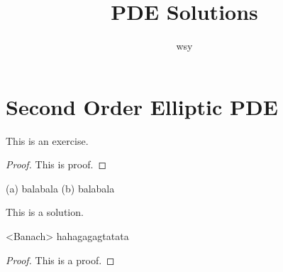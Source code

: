 \documentclass{mathexercise}
\title{PDE Solutions}
\author{wsy}
\begin{document}
\maketitle
  
\chapter{Second Order Elliptic PDE}

\begin{exercise}
  This is an exercise.
\end{exercise}

\begin{proof}
  This is proof.
\end{proof}

\begin{exercise}
  (a) balabala
  (b) balabala
\end{exercise}

\begin{solution}
  This is a solution.
\end{solution}

\begin{exercise}[4]<Banach>
  hahagagagtatata
\end{exercise}

\begin{proof}
  This is a proof.
\end{proof}
\end{document}
